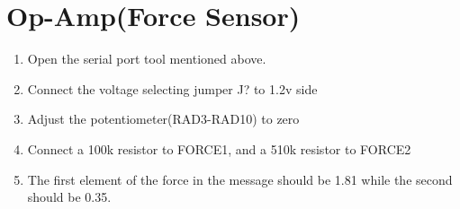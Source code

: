 \documentclass{article}
\begin{document}
\section{Op-Amp(Force Sensor)}
\begin{enumerate}
    \item Open the serial port tool mentioned above. 
    \item Connect the voltage selecting jumper J? to 1.2v side
    \item Adjust the potentiometer(RAD3-RAD10) to zero
    \item Connect a 100k resistor to FORCE1, and a 510k resistor to FORCE2
    \item The first element of the force in the message should be 1.81 while the second should be 0.35. 

\end{enumerate}
\end{document}

